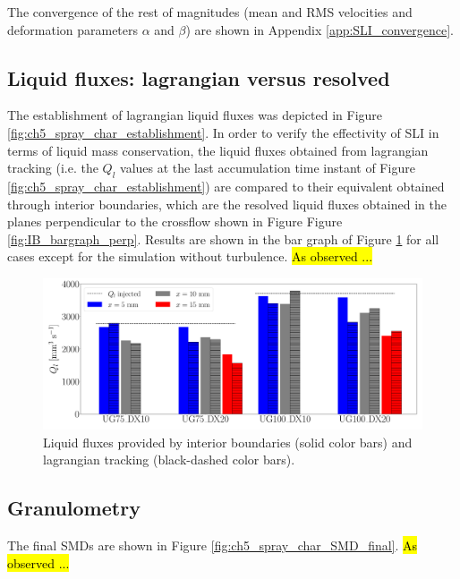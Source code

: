 The convergence of the rest of magnitudes (mean and RMS velocities and deformation parameters $\alpha$ and $\beta$) are shown in Appendix \ref{app:SLI_convergence}.


\subsection{Liquid fluxes: lagrangian versus resolved}
\label{subsec:ch5_sli_fluxes_vs_IBs}

The establishment of lagrangian liquid fluxes was depicted in Figure \ref{fig:ch5_spray_char_establishment}. In order to verify the effectivity of SLI in terms of liquid mass conservation, the liquid fluxes obtained from lagrangian tracking (i.e. the $Q_l$ values at the last accumulation time instant of Figure \ref{fig:ch5_spray_char_establishment}) are compared to their equivalent obtained through interior boundaries, which are the resolved liquid fluxes obtained in the planes perpendicular to the crossflow shown in Figure Figure \ref{fig:IB_bargraph_perp}. Results are shown in the bar graph of Figure \ref{fig:fluxes_bargraph_IBs_vs_LGS} for all cases except for the simulation without turbulence. \hl{As observed ...}

\begin{figure}[ht]
	\centering
   \includegraphics[scale=0.225]{./part2_developments/figures_ch5_resolved_JICF/SPRAY_characterization/establishment_and_fluxes/fluxes_SLI_vs_IBs}
   \caption{Liquid fluxes provided by interior boundaries (solid color bars) and lagrangian tracking (black-dashed color bars).}
   \label{fig:fluxes_bargraph_IBs_vs_LGS}
\end{figure}


\subsection{Granulometry}



The final SMDs are shown in Figure \ref{fig:ch5_spray_char_SMD_final}. \hl{As observed ...}


